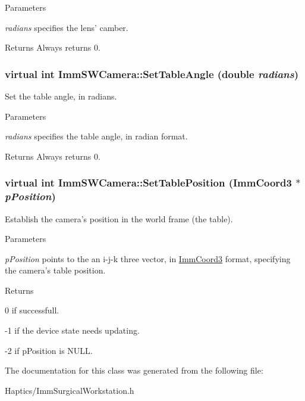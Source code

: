 \begin{DoxyParams}{Parameters}
\item[{\em radians}]specifies the lens' camber.\end{DoxyParams}
\begin{DoxyReturn}{Returns}
Always returns 0. 
\end{DoxyReturn}
\hypertarget{classImmSWCamera_a2c2141e6da700240fbfa7ab75008e791}{
\subsubsection[{SetTableAngle}]{\setlength{\rightskip}{0pt plus 5cm}virtual int ImmSWCamera::SetTableAngle (double {\em radians})}}
\label{classImmSWCamera_a2c2141e6da700240fbfa7ab75008e791}
Set the table angle, in radians.


\begin{DoxyParams}{Parameters}
\item[{\em radians}]specifies the table angle, in radian format.\end{DoxyParams}
\begin{DoxyReturn}{Returns}
Always returns 0. 
\end{DoxyReturn}
\hypertarget{classImmSWCamera_a991cc8ff7f77821f5a5004c4900df4f6}{
\subsubsection[{SetTablePosition}]{\setlength{\rightskip}{0pt plus 5cm}virtual int ImmSWCamera::SetTablePosition ({\bf ImmCoord3} $\ast$ {\em pPosition})}}
\label{classImmSWCamera_a991cc8ff7f77821f5a5004c4900df4f6}
Establish the camera's position in the world frame (the table).


\begin{DoxyParams}{Parameters}
\item[{\em pPosition}]points to the an i-\/j-\/k three vector, in \hyperlink{structImmCoord3}{ImmCoord3} format, specifying the camera's table position.\end{DoxyParams}
\begin{DoxyReturn}{Returns}

\end{DoxyReturn}
0 if successfull.

-\/1 if the device state needs updating.

-\/2 if pPosition is NULL. 

The documentation for this class was generated from the following file:\begin{DoxyCompactItemize}
\item 
Haptics/ImmSurgicalWorkstation.h\end{DoxyCompactItemize}

